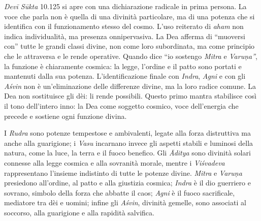 \textit{Devī Sūkta} 10.125 si apre con una dichiarazione radicale in prima persona. La voce che parla non è quella di una divinità particolare, ma di una potenza che si identifica con il funzionamento stesso del cosmo. L’uso reiterato di \textit{aham} non indica individualità, ma presenza onnipervasiva. La Dea afferma di “muoversi con” tutte le grandi classi divine, non come loro subordinata, ma come principio che le attraversa e le rende operative. Quando dice “io sostengo \textit{Mitra} e \textit{Varuṇa”}, la funzione è chiaramente cosmica: la legge, l’ordine e il patto sono portati e mantenuti dalla sua potenza. L’identificazione finale con \textit{Indra}, \textit{Agni} e con gli \textit{Aśvin} non è un’eliminazione delle differenze divine, ma la loro radice comune. La Dea non sostituisce gli dèi: li rende possibili. Questo primo mantra stabilisce così il tono dell’intero inno: la Dea come soggetto cosmico, voce dell’energia che precede e sostiene ogni funzione divina.

I \textit{Rudra} sono potenze tempestose e ambivalenti, legate alla forza distruttiva ma anche alla guarigione; i \textit{Vasu} incarnano invece gli aspetti stabili e luminosi della natura, come la luce, la terra e il fuoco benefico. Gli \textit{Āditya} sono divinità solari connesse alla legge cosmica e alla sovranità morale, mentre i \textit{Viśvadeva} rappresentano l’insieme indistinto di tutte le potenze divine. \textit{Mitra} e \textit{Varuṇa} presiedono all’ordine, al patto e alla giustizia cosmica; \textit{Indra} è il dio guerriero e sovrano, simbolo della forza che abbatte il caos; \textit{Agni} è il fuoco sacrificale, mediatore tra dèi e uomini; infine gli \textit{Aśvin}, divinità gemelle, sono associati al soccorso, alla guarigione e alla rapidità salvifica.